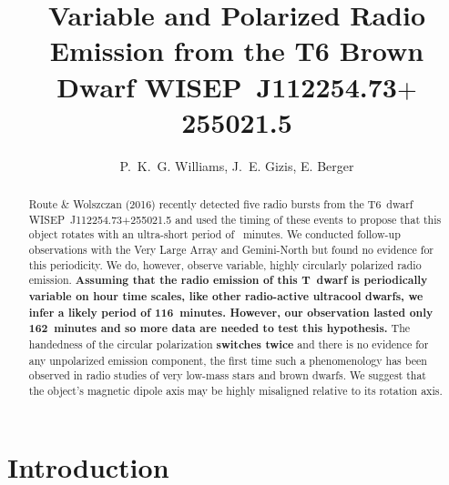 \documentclass[twocolumn, times]{aastex6}
\begin{document}
\title{Variable and Polarized Radio Emission from the T6 Brown Dwarf WISEP~J112254.73$+$255021.5}
\author{
  P.~K.~G. Williams,
  J.~E. Gizis,
  E. Berger
}



\slugcomment{\version}

\begin{abstract}
  Route \& Wolszczan (2016) recently detected five radio bursts from the
  T6~dwarf WISEP~J112254.73$+$255021.5 and used the timing of these events to
  propose that this object rotates with an ultra-short period of
  ~minutes. We conducted follow-up observations with the Very Large
  Array and Gemini-North but found no evidence for this periodicity. We do,
  however, observe variable, highly circularly polarized radio emission.
  \textbf{Assuming that the radio emission of this T~dwarf is periodically
    variable on \apx hour time scales, like other radio-active ultracool
    dwarfs, we infer a likely period of 116~minutes. However, our observation
    lasted only 162~minutes and so more data are needed to test this
    hypothesis.} The handedness of the circular polarization \textbf{switches
    twice} and there is no evidence for any unpolarized emission component,
  the first time such a phenomenology has been observed in radio studies of
  very low-mass stars and brown dwarfs. We suggest that the object's magnetic
  dipole axis may be highly misaligned relative to its rotation axis.
\end{abstract}



\section{Introduction}
\end{document}
